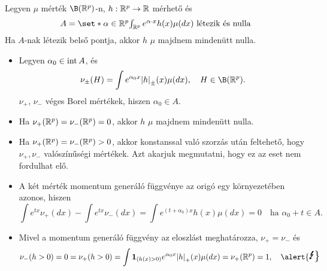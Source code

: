 \documentclass[aspectratio=169,notheorems,9pt,\option]{beamer}
\begin{document}
  \begin{frame}%
    \begin{theorem}
      Legyen $\mu$ mérték $\B (\real^p)$-n, $h:\mathbb{R}^p\to\mathbb{R}$ mérhető és 
      \begin{displaymath}\textstyle
        A=\set*{\alpha\in\real^p}{\text{$\int_{\real^p} e^{\alpha \cdot x}h (x)\mu
          (dx)$ létezik és nulla}}%
      \end{displaymath}
      Ha $A$-nak létezik belső pontja, akkor $h$ $\mu$ majdnem mindenütt nulla.
    \end{theorem}
    \begin{itemize}
    \item Legyen $\alpha_0\in\operatorname{int} A$, és
      \begin{displaymath}
        \nu_{\pm} (H)=\int e^{\alpha_0x}\abs*{h}_\pm (x) \mu (d x),\quad H\in\B(\real^p).
      \end{displaymath}
      $\nu_{+}$, $\nu_{-}$ véges Borel mértékek,  hiszen $\alpha_0\in A$.
    \item  Ha $\nu_{+} (\mathbb{R}^p)=\nu_{-} (\mathbb{R}^p) = 0$, akkor $h$ $\mu$ majdnem mindenütt
      nulla.
    \item Ha $\nu_{+}(\mathbb{R}^p)=\nu_{-} (\mathbb{R}^p)>0$, akkor konstanssal
      való szorzás után feltehető, hogy $\nu_{+},\nu_{-}$ valószínűségi
      mértékek. Azt akarjuk megmutatni, hogy ez az eset nem fordulhat
      elő. 
      
    \item A két mérték momentum generáló függvénye az origó egy
      környezetében azonos, hiszen
      \begin{displaymath}
        \int e^{t x}\nu_{+} (d x)-\int e^{t x}\nu_{-} (d x)=\int
        e^{(t+\alpha_0)x}h (x)\mu (d x)=0
            \quad\text{ha $\alpha_0+t\in A$.}
      \end{displaymath}
    \item Mivel a momentum generáló függvény az eloszlást meghatározza,
      $\nu_{+}=\nu_{-}$ és %
      \begin{displaymath}
        \nu_{-} (h>0)=0=\nu_{+}(h>0)=
        \int \I{h (x) >0} e^{\alpha_0 x}\abs*{h}_+ (x)\mu (d x)=
        \nu_{+} (\real^p)=1,
        \quad\text{\alert{\Large\Lightning}}
      \end{displaymath}
    \end{itemize}
  \end{frame}
  
\end{document}
